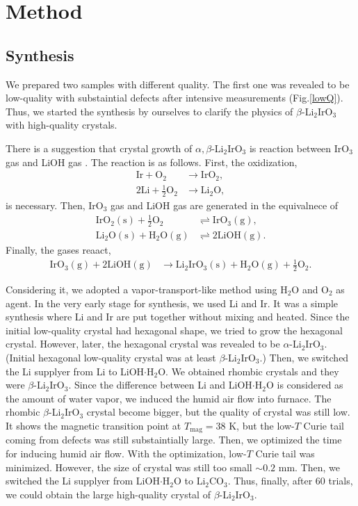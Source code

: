 \documentclass[a4,10.5pt]{report}
\begin{document}
\chapter{Method}
\label{method}
\section{Synthesis}
We prepared two samples with different quality.
The first one was revealed to be low-quality with substaintial defects after intensive measurements (Fig.\ref{lowQ}).
Thus, we started the synthesis by ourselves to clarify the physics of $\beta$-Li$_2$IrO$_3$ with high-quality crystals.

There is a suggestion that crystal growth of $\alpha, \beta$-Li$_2$IrO$_3$ is reaction between IrO$_3$ gas and LiOH gas \cite{Freund2016}.
The reaction is as follows.
First, the oxidization, 
\begin{align}
\mathrm{Ir} + \mathrm{O_2} &\rightarrow \mathrm{IrO_2},\\
\mathrm{2Li} + \mathrm{\frac{1}{2}O_2} &\rightarrow \mathrm{Li_2O},
\end{align}
is necessary.
Then, IrO$_3$ gas and LiOH gas are generated in the equivalnece of 
\begin{align}
\mathrm{IrO_2 (s)} + \mathrm{\frac{1}{2}O_2} &\rightleftharpoons \mathrm{IrO_3 (g)},\\
\mathrm{Li_2O (s)} + \mathrm{H_2O (g)} &\rightleftharpoons \mathrm{2LiOH (g)}.
\end{align}
Finally, the gases reaact,
\begin{align}
\mathrm{IrO_3 (g)} + \mathrm{2LiOH (g)} &\rightarrow \mathrm{Li_2IrO_3 (s)} + \mathrm{H_2O (g)} + \mathrm{\frac{1}{2}O_2}.
\end{align}

Considering it, we adopted a vapor-transport-like method using H$_2$O and O$_2$ as agent.
In the very early stage for synthesis, we used Li and Ir.
It was a simple synthesis where Li and Ir are put together without mixing and heated.
Since the initial low-quality crystal had hexagonal shape, we tried to grow the hexagonal crystal.
However, later, the hexagonal crystal was revealed to be $\alpha$-Li$_2$IrO$_3$.
(Initial hexagonal low-quality crystal was at least $\beta$-Li$_2$IrO$_3$.)
Then, we switched the Li supplyer from Li to LiOH$\cdot$H$_2$O.
We obtained rhombic crystals and they were $\beta$-Li$_2$IrO$_3$.
Since the difference between Li and LiOH$\cdot$H$_2$O is considered as the amount of water vapor, we induced the humid air flow into furnace.
The rhombic $\beta$-Li$_2$IrO$_3$ crystal become bigger, but the quality of crystal was still low.
It shows the magnetic transition point at $T_\mathrm{mag} = 38$ K, but the low-$T$ Curie tail coming from defects was still substaintially large.
Then, we optimized the time for inducing humid air flow.
With the optimization, low-$T$ Curie tail was minimized.
However, the size of crystal was still too small $\sim 0.2$ mm.
Then, we switched the Li supplyer from LiOH$\cdot$H$_2$O to Li$_2$CO$_3$.
Thus, finally, after 60 trials, we could obtain the large high-quality crystal of $\beta$-Li$_2$IrO$_3$.
\end{document}
